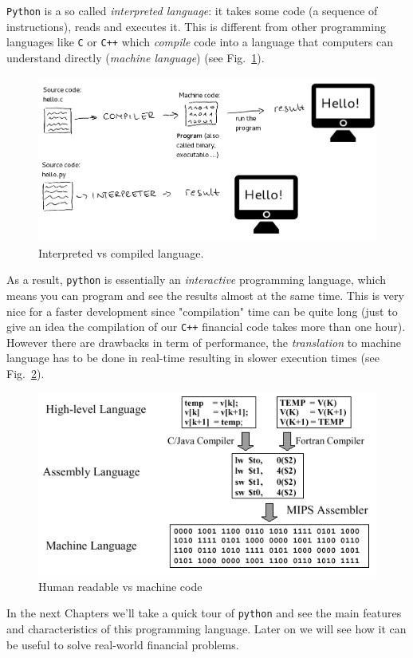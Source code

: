 \texttt{Python} is a so called \emph{interpreted language}: it takes some code (a sequence of instructions), reads and executes it. This is different from other programming languages like \texttt{C} or \texttt{C++} which \emph{compile} code into a language that computers can understand directly (\emph{machine language}) (see Fig.~\ref{fig:compiled_vs_interpreted}).

\begin{figure}[h]
\centering
\includegraphics[width=0.7\linewidth]{figures/compiled_language}
\caption{Interpreted vs compiled language.}
\label{fig:compiled_vs_interpreted}
\end{figure}

As a result, \texttt{python} is essentially an \emph{interactive} programming language, which means you can program and see the results almost at the same time. This is very nice for a faster development since "compilation" time can be quite long (just to give an idea the compilation of our \texttt{C++} financial code takes more than one hour).
However there are drawbacks in term of performance, the \emph{translation} to machine language has to be done in real-time resulting in slower execution times (see Fig.~\ref{fig:compilation}).

\begin{figure}[h]
\centering
\includegraphics[width=0.5\linewidth]{figures/machine_language.png}
\caption{Human readable vs machine code}
\label{fig:compilation}
\end{figure}

In the next Chapters we'll take a quick tour of \texttt{python} and see the main features and characteristics of this programming language. Later on we will see how it can be useful to solve real-world financial problems.

